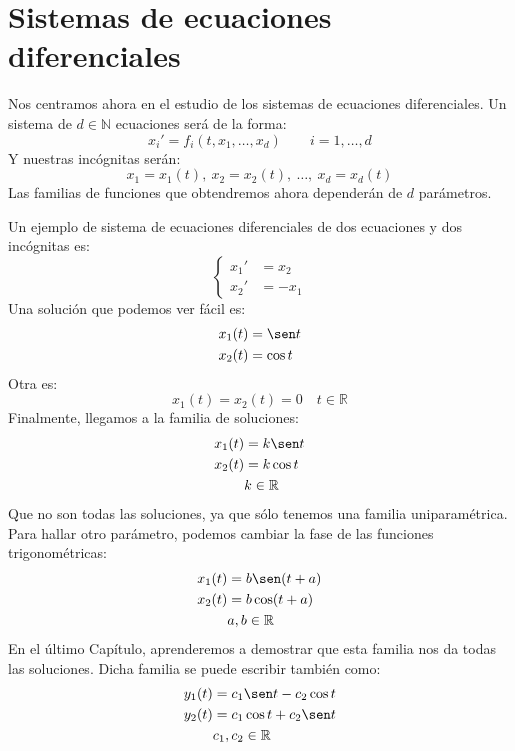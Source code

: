 \section{Sistemas de ecuaciones diferenciales}
Nos centramos ahora en el estudio de los sistemas de ecuaciones diferenciales. Un sistema de $d\in \mathbb{N}$ ecuaciones será de la forma:
\begin{equation*}
    x_i' = f_i(t,x_1,\ldots,x_d) \qquad i=1,\ldots, d
\end{equation*}
Y nuestras incógnitas serán:
\begin{equation*}
    x_1 = x_1(t),\ x_2 = x_2(t),\ \ldots,\ x_d = x_d(t)
\end{equation*}
Las familias de funciones que obtendremos ahora dependerán de $d$ parámetros.

\begin{ejemplo}
    Un ejemplo de sistema de ecuaciones diferenciales de dos ecuaciones y dos incógnitas es:
    \begin{equation*}
        \left\{\begin{array}{rl}
                x_1' &= x_2 \\
                x_2' &= -x_1
        \end{array}\right.
    \end{equation*}
    Una solución que podemos ver fácil es:
    \begin{align*}
        x_1(t) &= \sen t \\
        x_2(t) &= \cos t
    \end{align*}
    Otra es:
    \begin{equation*}
        x_1(t) = x_2(t) = 0 \quad t\in \mathbb{R}
    \end{equation*}
    Finalmente, llegamos a la familia de soluciones:
    \begin{align*}
        x_1(t) &= k \sen t \\
        x_2(t) &= k \cos t \\
               &k \in \mathbb{R}
    \end{align*}
    Que no son todas las soluciones, ya que sólo tenemos una familia uniparamétrica. Para hallar otro parámetro, podemos cambiar la fase de las funciones trigonométricas:
    \begin{align*}
        x_1(t) &= b \sen (t+a) \\
        x_2(t) &= b \cos (t+a) \\
               &a,b \in \mathbb{R}
    \end{align*}
    En el último Capítulo, aprenderemos a demostrar que esta familia nos da todas las soluciones. Dicha familia se puede escribir también como:
    \begin{align*}
        y_1(t) &= c_1 \sen t - c_2 \cos t \\
        y_2(t) &= c_1 \cos t + c_2 \sen t \\
               & c_1, c_2 \in \mathbb{R}
    \end{align*}
\end{ejemplo}

